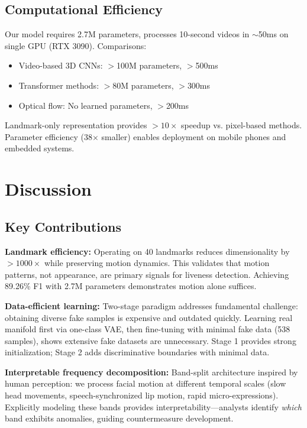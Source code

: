 \documentclass[10pt,twocolumn,letterpaper]{article}
\begin{document}
\subsection{Computational Efficiency}

Our model requires 2.7M parameters, processes 10-second videos in $\sim$50ms on single GPU (RTX 3090). Comparisons:
\begin{itemize}
\itemsep0em
    \item Video-based 3D CNNs: $>$100M parameters, $>$500ms
    \item Transformer methods: $>$80M parameters, $>$300ms
    \item Optical flow: No learned parameters, $>$200ms
\end{itemize}

Landmark-only representation provides $>10\times$ speedup vs. pixel-based methods. Parameter efficiency (38$\times$ smaller) enables deployment on mobile phones and embedded systems.

\section{Discussion}

\subsection{Key Contributions}

\textbf{Landmark efficiency:} Operating on 40 landmarks reduces dimensionality by $>1000\times$ while preserving motion dynamics. This validates that motion patterns, not appearance, are primary signals for liveness detection. Achieving 89.26\% F1 with 2.7M parameters demonstrates motion alone suffices.

\textbf{Data-efficient learning:} Two-stage paradigm addresses fundamental challenge: obtaining diverse fake samples is expensive and outdated quickly. Learning real manifold first via one-class VAE, then fine-tuning with minimal fake data (538 samples), shows extensive fake datasets are unnecessary. Stage 1 provides strong initialization; Stage 2 adds discriminative boundaries with minimal data.

\textbf{Interpretable frequency decomposition:} Band-split architecture inspired by human perception: we process facial motion at different temporal scales (slow head movements, speech-synchronized lip motion, rapid micro-expressions). Explicitly modeling these bands provides interpretability—analysts identify \emph{which} band exhibits anomalies, guiding countermeasure development.
\end{document}
